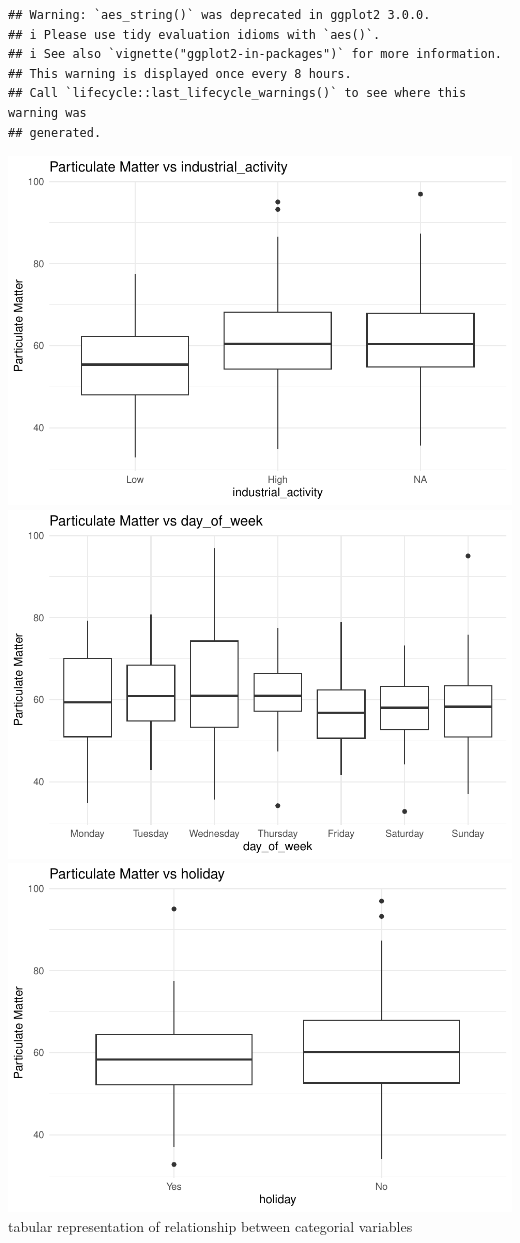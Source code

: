 \documentclass[12pt,halfline,a4paper,]{ouparticle}
\begin{document}
\begin{verbatim}
## Warning: `aes_string()` was deprecated in ggplot2 3.0.0.
## i Please use tidy evaluation idioms with `aes()`.
## i See also `vignette("ggplot2-in-packages")` for more information.
## This warning is displayed once every 8 hours.
## Call `lifecycle::last_lifecycle_warnings()` to see where this warning was
## generated.
\end{verbatim}

\includegraphics{Report_files/figure-latex/unnamed-chunk-2-1.pdf}
\includegraphics{Report_files/figure-latex/unnamed-chunk-2-2.pdf}
\includegraphics{Report_files/figure-latex/unnamed-chunk-2-3.pdf}
tabular representation of relationship between categorial variables
\end{document}
